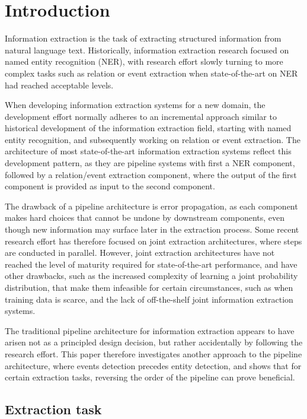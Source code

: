 \section{Introduction}

Information extraction is the task of extracting structured information from natural language text. Historically, information extraction research focused on named entity recognition (NER), with research effort slowly turning to more complex tasks such as relation or event extraction when state-of-the-art on NER had reached acceptable levels. 

When developing information extraction systems for a new domain, the development effort normally adheres to an incremental approach similar to historical development of the information extraction field, starting with named entity recognition, and subsequently working on relation or event extraction. The architecture of most state-of-the-art information extraction systems reflect this development pattern, as they are pipeline systems with first a NER component, followed by a relation/event extraction component, where the output of the first component is provided as input to the second component.

The drawback of a pipeline architecture is error propagation, as each component makes hard choices that cannot be undone by downstream components, even though new information may surface later in the extraction process. Some recent research effort has therefore focused on joint extraction architectures, where steps are conducted in parallel. However, joint extraction architectures have not reached the level of maturity required for state-of-the-art performance, and have other drawbacks, such as the increased complexity of learning a joint probability distribution, that make them infeasible for certain circumstances, such as when training data is scarce, and the lack of off-the-shelf joint information extraction systems. 

The traditional pipeline architecture for information extraction appears to have arisen not as a principled design decision, but rather accidentally by following the research effort. This paper therefore investigates another approach to the pipeline architecture, where events detection precedes entity detection, and shows that for certain extraction tasks, reversing the order of the pipeline can prove beneficial.  

\subsection{Extraction task}

